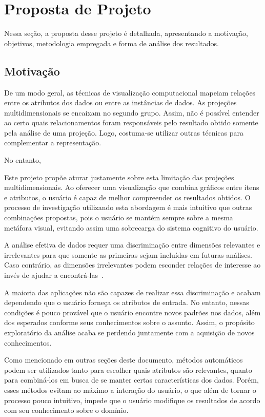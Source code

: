 \section{Proposta de Projeto}

Nessa seção, a proposta desse projeto é detalhada, apresentando a motivação, objetivos, metodologia empregada e forma de análise dos resultados.

\subsection{Motivação}

De um modo geral, as técnicas de visualização computacional mapeiam relações entre os atributos dos dados ou entre as instâncias de dados. As projeções multidimensionais se encaixam no segundo grupo. Assim, não é possível entender ao certo quais relacionamentos foram responsáveis pelo resultado obtido somente pela análise de uma projeção. Logo, costuma-se utilizar outras técnicas para complementar a representação.

No entanto, 

Este projeto propõe aturar justamente sobre esta limitação das projeções multidimensionais. Ao oferecer uma visualização que combina gráficos entre itens e atributos, o usuário é capaz de melhor compreender os resultados obtidos. O processo de investigação utilizando esta abordagem é mais intuitivo que outras combinações propostas, pois o usuário se mantém sempre sobre a mesma metáfora visual, evitando assim uma sobrecarga do sistema cognitivo do usuário.

A análise efetiva de dados requer uma discriminação entre dimensões relevantes e irrelevantes para que somente as primeiras sejam incluídas em futuras análises. Caso contrário, as dimensões irrelevantes podem esconder relações de interesse ao invés de ajudar a encontrá-las~\cite{Guo2003}. 

A maioria das aplicações não são capazes de realizar essa discriminação e acabam dependendo que o usuário forneça os atributos de entrada. No entanto, nessas condições é pouco provável que o usuário encontre novos padrões nos dados, além dos esperados conforme seus conhecimentos sobre o assunto. Assim, o propósito exploratório da análise acaba se perdendo juntamente com a aquisição de novos conhecimentos.    

Como mencionado em outras seções deste documento, métodos automáticos podem ser utilizados tanto para escolher quais atributos são relevantes, quanto para combiná-los em busca de se manter certas características dos dados. Porém, esses métodos evitam ao máximo a interação do usuário, o que além de tornar o processo pouco intuitivo, impede que o usuário modifique os resultados de acordo com seu conhecimento sobre o domínio.

